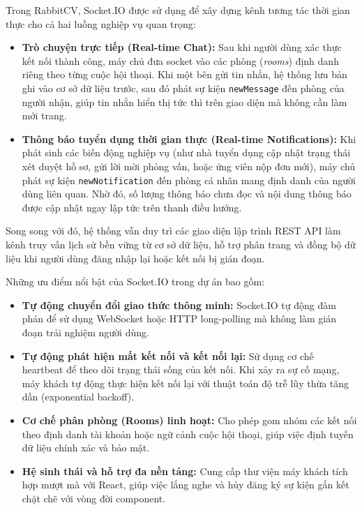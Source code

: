 Trong RabbitCV, Socket.IO được sử dụng để xây dựng kênh tương tác thời gian thực cho cả hai luồng nghiệp vụ quan trọng:
\begin{itemize}
    \item \textbf{Trò chuyện trực tiếp (Real-time Chat):} Sau khi người dùng xác thực kết nối thành công, máy chủ đưa socket vào các phòng (\textit{rooms}) định danh riêng theo từng cuộc hội thoại. Khi một bên gửi tin nhắn, hệ thống lưu bản ghi vào cơ sở dữ liệu trước, sau đó phát sự kiện \texttt{newMessage} đến phòng của người nhận, giúp tin nhắn hiển thị tức thì trên giao diện mà không cần làm mới trang.
    \item \textbf{Thông báo tuyển dụng thời gian thực (Real-time Notifications):} Khi phát sinh các biến động nghiệp vụ (như nhà tuyển dụng cập nhật trạng thái xét duyệt hồ sơ, gửi lời mời phỏng vấn, hoặc ứng viên nộp đơn mới), máy chủ phát sự kiện \texttt{newNotification} đến phòng cá nhân mang định danh của người dùng liên quan. Nhờ đó, số lượng thông báo chưa đọc và nội dung thông báo được cập nhật ngay lập tức trên thanh điều hướng.
\end{itemize}

Song song với đó, hệ thống vẫn duy trì các giao diện lập trình REST API làm kênh truy vấn lịch sử bền vững từ cơ sở dữ liệu, hỗ trợ phân trang và đồng bộ dữ liệu khi người dùng đăng nhập lại hoặc kết nối bị gián đoạn.

Những ưu điểm nổi bật của Socket.IO trong dự án bao gồm:
\begin{itemize}
    \item \textbf{Tự động chuyển đổi giao thức thông minh:} Socket.IO tự động đàm phán để sử dụng WebSocket hoặc HTTP long-polling mà không làm gián đoạn trải nghiệm người dùng.
    \item \textbf{Tự động phát hiện mất kết nối và kết nối lại:} Sử dụng cơ chế heartbeat để theo dõi trạng thái sống của kết nối. Khi xảy ra sự cố mạng, máy khách tự động thực hiện kết nối lại với thuật toán độ trễ lũy thừa tăng dần (exponential backoff).
    \item \textbf{Cơ chế phân phòng (Rooms) linh hoạt:} Cho phép gom nhóm các kết nối theo định danh tài khoản hoặc ngữ cảnh cuộc hội thoại, giúp việc định tuyến dữ liệu chính xác và bảo mật.
    \item \textbf{Hệ sinh thái và hỗ trợ đa nền tảng:} Cung cấp thư viện máy khách tích hợp mượt mà với React, giúp việc lắng nghe và hủy đăng ký sự kiện gắn kết chặt chẽ với vòng đời component.
\end{itemize}

